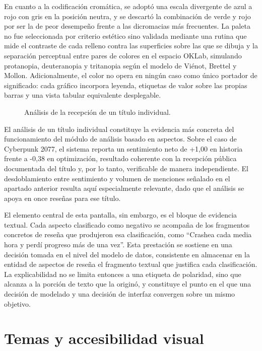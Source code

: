 En cuanto a la codificación cromática, se adoptó una escala divergente de azul a rojo con gris en la posición neutra, y se descartó la combinación de verde y rojo por ser la de peor desempeño frente a las dicromacias más frecuentes. La paleta no fue seleccionada por criterio estético sino validada mediante una rutina que mide el contraste de cada relleno contra las superficies sobre las que se dibuja y la separación perceptual entre pares de colores en el espacio OKLab, simulando protanopia, deuteranopia y tritanopia según el modelo de Viénot, Brettel y Mollon. Adicionalmente, el color no opera en ningún caso como único portador de significado: cada gráfico incorpora leyenda, etiquetas de valor sobre las propias barras y una vista tabular equivalente desplegable.

\begin{figure}[ht]
	\centering
	\caption{Análisis de la recepción de un título individual.}
	\label{fig:ui-analisis-titulo}
\end{figure}

El análisis de un título individual constituye la evidencia más concreta del funcionamiento del módulo de análisis basado en aspectos. Sobre el caso de Cyberpunk 2077, el sistema reporta un sentimiento neto de +1,00 en historia frente a -0,38 en optimización, resultado coherente con la recepción pública documentada del título y, por lo tanto, verificable de manera independiente. El desdoblamiento entre sentimiento y volumen de menciones señalado en el apartado anterior resulta aquí especialmente relevante, dado que el análisis se apoya en once reseñas para ese título.

El elemento central de esta pantalla, sin embargo, es el bloque de evidencia textual. Cada aspecto clasificado como negativo se acompaña de los fragmentos concretos de reseña que produjeron esa clasificación, como \enquote{Crashea cada media hora y perdí progreso más de una vez}. Esta prestación se sostiene en una decisión tomada en el nivel del modelo de datos, consistente en almacenar en la entidad de aspectos de reseña el fragmento textual que justifica cada clasificación. La explicabilidad no se limita entonces a una etiqueta de polaridad, sino que alcanza a la porción de texto que la originó, y constituye el punto en el que una decisión de modelado y una decisión de interfaz convergen sobre un mismo objetivo.

\section*{Temas y accesibilidad visual}

